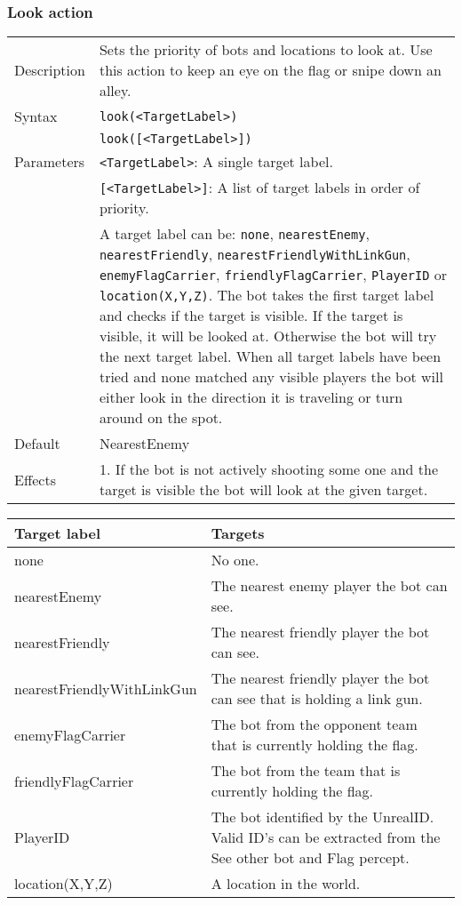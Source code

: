 \documentclass[11pt,a4paper]{article}
\begin{document}
\subsubsection*{Look action}
\begin{small}
\begin{tabular}{p{2cm}p{9cm}}
Description & Sets the priority of bots and locations to look at. Use this action to keep an eye on the flag or snipe down an alley. \\
Syntax & \verb|look(<TargetLabel>)|\\
	& \verb|look([<TargetLabel>])|\\

Parameters 	& \verb|<TargetLabel>|: A single target label. \\
		& \verb|[<TargetLabel>]|: A list of target labels in order of priority.\\
		&  A target label can be:  \verb|none|, \verb|nearestEnemy|, \verb|nearestFriendly|, \verb|nearestFriendlyWithLinkGun|, \verb|enemyFlagCarrier|, \verb|friendlyFlagCarrier|, \verb|PlayerID| or \verb|location(X,Y,Z)|. The bot takes the first target label and checks if the target is visible. If the target is visible, it will be looked at. Otherwise the bot will try the next target label. When all target labels have been tried and none matched any visible players the bot will either look in the direction it is traveling or turn around on the spot.\\

Default & NearestEnemy\\

Effects & 1.	If the bot is not actively shooting some one and the target is visible the bot will look at the given target. 
\end{tabular}

\begin{tabular}{|p{4cm}|p{7cm}|}	
	\hline
Target label & Targets\\
\hline
none & No one. \\
nearestEnemy & The nearest enemy player the bot can see. \\
nearestFriendly &  The nearest friendly player the bot can see. \\
nearestFriendlyWithLinkGun & The nearest friendly player the bot can see that is holding a link gun. \\
enemyFlagCarrier & The bot from the opponent team that is currently holding the flag. \\
friendlyFlagCarrier & The bot from the team that is currently holding the flag.\\
PlayerID & The bot identified by the UnrealID. Valid ID's can be extracted from the See other bot and Flag percept. \\
location(X,Y,Z) & A location in the world.\\

\hline
\end{tabular}
\end{small}
\end{document}
